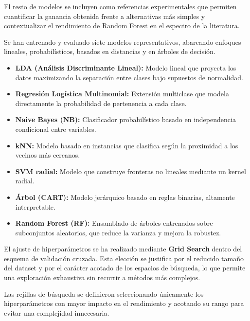 El resto de modelos se incluyen como referencias experimentales que permiten
cuantificar la ganancia obtenida frente a alternativas m\'as simples y
contextualizar el rendimiento de Random Forest en el espectro de la
literatura.


Se han entrenado y evaluado siete modelos representativos, abarcando enfoques lineales, probabilísticos, 
basados en distancias y en árboles de decisión.

\begin{itemize}
    \item \textbf{LDA (Análisis Discriminante Lineal):} Modelo lineal que proyecta los datos maximizando 
    la separación entre clases bajo supuestos de normalidad.

    \item \textbf{Regresión Logística Multinomial:} Extensión multiclase que modela directamente la 
    probabilidad de pertenencia a cada clase.

    \item \textbf{Naive Bayes (NB):} Clasificador probabilístico basado en independencia condicional 
    entre variables.

    \item \textbf{kNN:} Modelo basado en instancias que clasifica según la proximidad a los vecinos más 
    cercanos.

    \item \textbf{SVM radial:} Modelo que construye fronteras no lineales mediante un kernel radial.

    \item \textbf{Árbol (CART):} Modelo jerárquico basado en reglas binarias, altamente interpretable.

    \item \textbf{Random Forest (RF):} Ensamblado de árboles entrenados sobre subconjuntos aleatorios, 
    que reduce la varianza y mejora la robustez.
\end{itemize}

El ajuste de hiperparámetros se ha realizado mediante \textbf{Grid Search} dentro del esquema de validación 
cruzada. Esta elección se justifica por el reducido tamaño del dataset y por el carácter acotado de los 
espacios de búsqueda, lo que permite una exploración exhaustiva sin recurrir a métodos más complejos.

Las rejillas de búsqueda se definieron seleccionando únicamente los hiperparámetros con mayor impacto en 
el rendimiento y acotando su rango para evitar una complejidad innecesaria.


